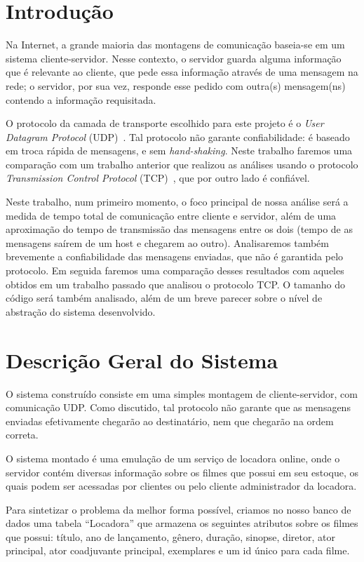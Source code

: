 \documentclass[12pt,a4paper]{article}
\begin{document}
\section{Introdução}
Na Internet, a grande maioria das montagens de comunicação baseia-se em um sistema cliente-servidor. Nesse contexto, o servidor guarda alguma informação que é relevante ao cliente, que pede essa informação através de uma mensagem na rede; o servidor, por sua vez, responde esse pedido com outra(s) mensagem(ns) contendo a informação requisitada.

O protocolo da camada de transporte escolhido para este projeto é o {\it User Datagram Protocol} (UDP)~\cite{postel1980user}. Tal protocolo não garante confiabilidade: é baseado em troca rápida de mensagens, e sem {\it hand-shaking}. Neste trabalho faremos uma comparação com um trabalho anterior que realizou as análises usando o protocolo {\it Transmission Control Protocol} (TCP)~\cite{postel1981transmission}, que por outro lado é confiável.

Neste trabalho, num primeiro momento, o foco principal de nossa análise será a medida de tempo total de comunicação entre cliente e servidor, além de uma aproximação do tempo de transmissão das mensagens entre os dois (tempo de as mensagens saírem de um host e chegarem ao outro). Analisaremos também brevemente a confiabilidade das mensagens enviadas, que não é garantida pelo protocolo. Em seguida faremos uma comparação desses resultados com aqueles obtidos em um trabalho passado que analisou o protocolo TCP. O tamanho do código será também analisado, além de um breve parecer sobre o nível de abstração do sistema desenvolvido.

\section{Descrição Geral do Sistema}

O sistema construído consiste em uma simples montagem de cliente-servidor, com comunicação UDP. Como discutido, tal protocolo não garante que as mensagens enviadas efetivamente chegarão ao destinatário, nem que chegarão na ordem correta.

    O sistema montado é uma emulação de um serviço de locadora online, onde o servidor contém diversas informação sobre os filmes que possui em seu estoque, os quais podem ser acessadas por clientes ou pelo cliente administrador da locadora. 
    
    Para sintetizar o problema da melhor forma possível, criamos no nosso banco de dados uma tabela “Locadora” que armazena os seguintes atributos sobre os filmes que possui: título, ano de lançamento, gênero, duração, sinopse, diretor, ator principal, ator coadjuvante principal, exemplares e um id único para cada filme. 
    
\end{document}
